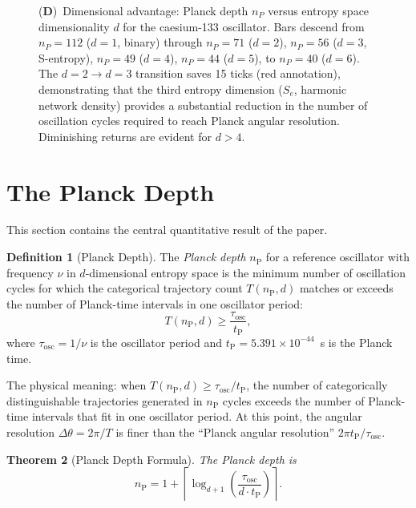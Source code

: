 \documentclass[twocolumn,10pt,a4paper]{article}
\newtheorem{theorem}{Theorem}[section]
\theoremstyle{definition}
\newtheorem{definition}[theorem]{Definition}
\theoremstyle{remark}
\newcommand{\Se}{S_e}
\newcommand{\tP}{t_{\mathrm{P}}}
\newcommand{\nP}{n_{\mathrm{P}}}
\begin{document}
\begin{figure}[!htbp]
{    (\textbf{D})~Dimensional advantage: Planck depth $n_P$ versus entropy space dimensionality $d$ for the caesium-133 oscillator. Bars descend from $n_P = 112$ ($d = 1$, binary) through $n_P = 71$ ($d = 2$), $n_P = 56$ ($d = 3$, S-entropy), $n_P = 49$ ($d = 4$), $n_P = 44$ ($d = 5$), to $n_P = 40$ ($d = 6$). The $d = 2 \to d = 3$ transition saves 15 ticks (red annotation), demonstrating that the third entropy dimension ($\Se$, harmonic network density) provides a substantial reduction in the number of oscillation cycles required to reach Planck angular resolution. Diminishing returns are evident for $d > 4$.}
    \label{fig:angular_resolution}
\end{figure}


\section{The Planck Depth}
\label{sec:planck_depth}

This section contains the central quantitative result of the paper.

\begin{definition}[Planck Depth]
\label{def:planck_depth}
The \emph{Planck depth} $\nP$ for a reference oscillator with frequency $\nu$ in $d$-dimensional entropy space is the minimum number of oscillation cycles for which the categorical trajectory count $T(\nP, d)$ matches or exceeds the number of Planck-time intervals in one oscillator period:
\begin{equation}
\label{eq:planck_depth_def}
T(\nP, d) \geq \frac{\tau_{\mathrm{osc}}}{\tP},
\end{equation}
where $\tau_{\mathrm{osc}} = 1/\nu$ is the oscillator period and $\tP = 5.391 \times 10^{-44}$~s is the Planck time.
\end{definition}

The physical meaning: when $T(\nP, d) \geq \tau_{\mathrm{osc}} / \tP$, the number of categorically distinguishable trajectories generated in $\nP$ cycles exceeds the number of Planck-time intervals that fit in one oscillator period. At this point, the angular resolution $\Delta\theta = 2\pi / T$ is finer than the ``Planck angular resolution'' $2\pi \tP / \tau_{\mathrm{osc}}$.

\begin{theorem}[Planck Depth Formula]
\label{thm:planck_depth}
The Planck depth is
\begin{equation}
\label{eq:planck_depth}
\nP = 1 + \left\lceil \log_{d+1}\!\left(\frac{\tau_{\mathrm{osc}}}{d \cdot \tP}\right) \right\rceil.
\end{equation}
\end{theorem}
\end{document}
